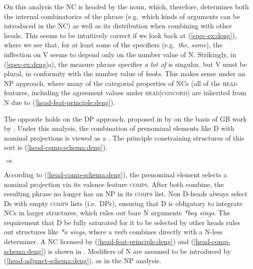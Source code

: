 \documentclass[output=paper,colorlinks,citecolor=brown]{langscibook}
\begin{document}
On this analysis the NC is headed by the noun, which, therefore, determines both the internal combinatorics of the phrase (e.g.\ which kinds of arguments can be introduced in the NC) as well as its distribution when combining with other heads. This seems to be intuitively correct if we look back at (\ref{spec-ex:deng}), where we see that, for at least some of the specifiers (e.g.\ \textit{the}, \textit{some}), the inflection on V seems to depend only on the number value of N. Strikingly,  in (\ref{spec-ex:deng}a), the measure phrase specifier \textit{a lot of} is singular, but V must be plural, in conformity with the number value of \textit{books}. This makes sense under an NP approach, where many of the categorial properties of NCs (all of the \textsc{head} features, including the agreement values under \textsc{head}|\textsc{concord}) are inherited from N due to (\ref{head-feat-principle:deng}).

	
The opposite holds on the DP approach, proposed in  by \citet{Netter94a} on the basis of GB work by \citet{Abney87a}. Under this analysis, the combination of prenominal elements like D with nominal projections is viewed as a  .  The principle constraining structures of this sort is (\ref{head-comp-schema:deng}).


\ea \label{head-comp-schema:deng}
	 $\Rightarrow$ \\ 
\z 


\noindent According to (\ref{head-comp-schema:deng}), the prenominal element selects a nominal projection via its valence feature \textsc{comps}. After both combine, the resulting phrase no longer has an NP in its \textsc{comps} list. Non D-heads always select  Ds with empty \textsc{comps} lists (i.e.\ DPs), ensuring that D is obligatory to integrate NCs in larger structures, which rules out bare N arguments \textit{*boy sings}. The requirement that D be fully saturated for it to be selected by other heads rules out structures like \textit{*a sings}, where a verb combines directly with a N-less determiner. A  NC licensed by (\ref{head-feat-principle:deng}) and (\ref{head-comp-schema:deng}) is shown in . Modifiers of N are assumed to be introduced by (\ref{head-adjunct-schema:deng}), as in the NP analysis. 
\end{document}
